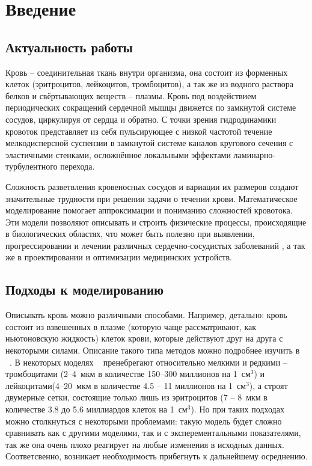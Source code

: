 \section{Введение}
\subsection{Актуальность работы}

Кровь -- соединительная ткань внутри организма, она состоит из форменных клеток (эритроцитов, лейкоцитов, тромбоцитов), а так же из
водного раствора белков и свёртывающих веществ -- плазмы. Кровь под воздействием периодических сокращений сердечной мышцы 
движется по замкнутой системе сосудов, циркулируя от сердца и обратно. С точки зрения гидродинамики кровоток представляет 
из себя пульсирующее с низкой частотой течение мелкодисперсной суспензии в 
замкнутой системе каналов кругового сечения с эластичными стенками, осложнённое локальными эффектами ламинарно-турбулентного перехода.

Сложность разветвления кровеносных сосудов и вариации их размеров создают значительные трудности при решении задачи о течении крови. 
Математическое моделирование помогает  
аппроксимации и пониманию сложностей кровотока. Эти модели позволяют описывать и строить физические процессы, происходящие 
в биологических областях, что может быть полезно при выявлении, прогрессировании и лечении  различных сердечно-сосудистых заболеваний , 
а так же в проектировании и оптимизации медицинских устройств.

\subsection{Подходы к моделированию}

Описывать кровь можно различными способами. Например, детально: кровь состоит из взвешенных в плазме 
(которую чаще рассматривают, как ньютоновскую жидкость) клеток крови, которые действуют друг на друга с некоторыми силами. 
Описание такого типа методов можно подробнее изучить в ~\cite{Fedosov2010,Fedosov2008,Mehboudi2001}. 
В некоторых моделях ~\cite{bessonov:2014,hosseini:2009} пренебрегают относительно мелкими и редкими -- тромбоцитами
(2--4~мкм в количестве 150--300 миллионов на 1~см$^3$) и лейкоцитами(4--20~мкм в количестве 4.5 -- 11 миллионов на 1~см$^3$), 
а строят двумерные сетки, состоящие только лишь из эритроцитов (7 -- 8~мкм в количестве 3.8 до 5.6 миллиардов клеток на 1~см$^3$).
Но при таких подходах можно столкнуться с некоторыми проблемами: такую модель будет сложно сравнивать как
с другими моделями, так и с эксперементальными показателями, так же она очень плохо реагирует на любые изменения в исходных данных. 
Соответсвенно, возникает необходимость прибегнуть к дальнейшему осреднению.

